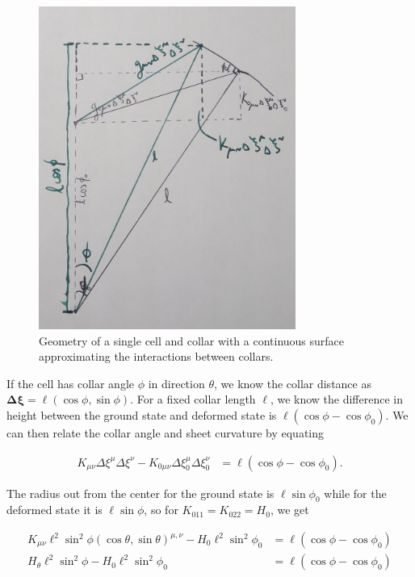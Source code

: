\begin{figure}[htbp]
    \centering
    \includegraphics[width=0.75\textwidth]{geom.jpg}
    \caption[Geometry for continuous approximation of \textit{C. flexa} sheets]{Geometry of a single cell and collar with a continuous surface approximating the interactions between collars.}
    \label{fig:geom}
\end{figure}

If the cell has collar angle $\phi$ in direction $\theta$, we know the collar distance as $\bm{\Delta\xi} = \ell(\cos\phi, \sin\phi)$. For a fixed collar length $\ell$, we know the difference in height between the ground state and deformed state is $\ell(\cos\phi - \cos\phi_0)$. We can then relate the collar angle and sheet curvature by equating 

\begin{align}
    K_{\mu\nu}\Delta\xi^\mu\Delta\xi^\nu - K_{0\mu\nu}\Delta\xi_0^\mu\Delta\xi_0^\nu &= \ell(\cos\phi - \cos\phi_0). \label{eq:base}
\end{align}

The radius out from the center for the ground state is $\ell\sin\phi_0$ while for the deformed state it is $\ell\sin\phi$, so for $K_{011}=K_{022}=H_0$, we get

\begin{align*}
    K_{\mu\nu}\ell^2\sin^2\phi (\cos\theta, \sin\theta)^{\mu,\nu} - H_0 \ell^2\sin^2\phi_0 &= \ell(\cos\phi - \cos\phi_0) \\
    H_\theta \ell^2\sin^2\phi - H_0 \ell^2\sin^2\phi_0 &= \ell(\cos\phi - \cos\phi_0)
\end{align*}

